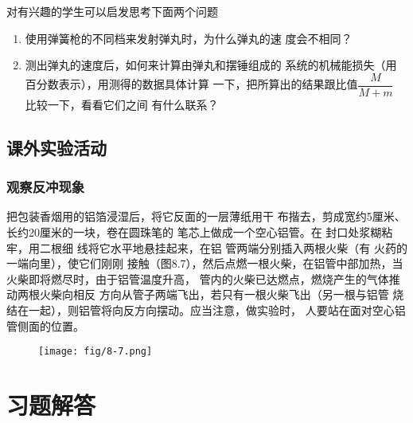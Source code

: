 对有兴趣的学生可以启发思考下面两个问题
\begin{enumerate}
\item 使用弹簧枪的不同档来发射弹丸时，为什么弹丸的速
度会不相同？
\item 测出弹丸的速度后，如何来计算由弹丸和摆锤组成的
系统的机械能损失（用百分数表示），用测得的数据具体计算
一下，把所算出的结果跟比值$\dfrac{M}{M+m}$
比较一下，看看它们之间
有什么联系？
\end{enumerate}

\subsection{课外实验活动}
\subsubsection{观察反冲现象}
把包装香烟用的铝箔浸湿后，将它反面的一层薄纸用干
布揩去，剪成宽约5厘米、长约20厘米的一块，卷在圆珠笔的
笔芯上做成一个空心铝管。在
封口处浆糊粘牢，用二根细
线将它水平地悬挂起来，在铝
管两端分别插入两根火柴（有
火药的一端向里），使它们刚刚
接触（图8.7），然后点燃一根火柴，在铝管中部加热，当火柴即将燃尽时，由于铝管温度升高，
管内的火柴已达燃点，燃烧产生的气体推动两根火柴向相反
方向从管子两端飞出，若只有一根火柴飞出（另一根与铝管
烧结在一起），则铝管将向反方向摆动。应当注意，做实验时，
人要站在面对空心铝管侧面的位置。

\begin{figure}[htp]
    \centering
    \texttt{[image: fig/8-7.png]}
    \caption{}
\end{figure}



\section{习题解答}

